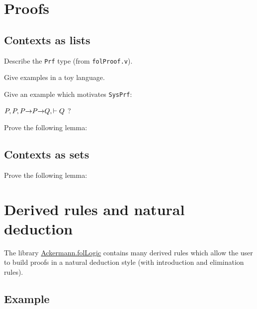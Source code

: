 






\section{Proofs}

\subsection{Contexts as lists}
\begin{todo}
Describe the \texttt{Prf} type (from \texttt{folProof.v}).

Give examples in a toy language.

Give an example which motivates \texttt{SysPrf}:

$P,P , P\mbox{$\rightarrow$} P \mbox{$\rightarrow$} Q, \vdash Q$ ?
\end{todo}

\begin{exercise}

Prove the following lemma:

\end{exercise}

\subsection{Contexts as sets}

\begin{exercise}

Prove the following lemma:

\end{exercise}


\section{Derived rules and natural deduction}


 The library 
 \href{../theories/html/hydras.Ackermann.folLogic.html}{Ackermann.folLogic} contains many derived rules which allow the user to build proofs in a natural deduction style (with introduction and elimination rules).

\subsection{Example}

